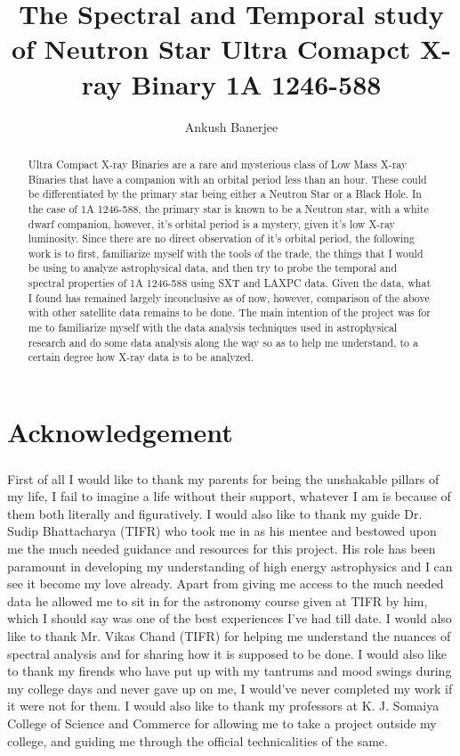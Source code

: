 \documentclass[a4paper,twoside]{report}
\title{The Spectral and Temporal study of Neutron Star Ultra Comapct X-ray Binary 1A 1246-588}
\author{Ankush Banerjee}
\numberwithin{equation}{section}
\begin{document}
\maketitle
\begin{abstract}
Ultra Compact X-ray Binaries are a rare and mysterious class of Low Mass X-ray Binaries that have a companion with an orbital period less than an hour. These could be differentiated by the primary star being either a Neutron Star or a Black Hole. In the case of 1A 1246-588, the primary star is known to be a Neutron star, with a white dwarf companion, however, it’s orbital period is a mystery, given it’s low X-ray luminosity. Since there are no direct observation of it’s orbital period, the following work is to first, familiarize myself with the tools of the trade, the things that I would be using to analyze astrophysical data, and then try to probe the temporal and spectral properties of 1A 1246-588 using SXT and LAXPC data. Given the data, what I found has remained largely inconclusive as of now, however, comparison of the above with other satellite data remains to be done. The main intention of the project was for me to familiarize myself with the data analysis techniques used in astrophysical research and do some data analysis along the way so as to help me understand, to a certain degree how X-ray data is to be analyzed.
\end{abstract}
\newpage
\tableofcontents{}
\newpage
\chapter{Acknowledgement}
\paragraph{}
First of all I would like to thank my parents for being the unshakable pillars of my life, I fail to imagine a life without their support, whatever I am is because of them both literally and figuratively. I would also like to thank my guide Dr. Sudip Bhattacharya (TIFR) who took me in as his mentee and bestowed upon me the much needed guidance and resources for this project. His role has been paramount in developing my understanding of high energy astrophysics and I can see it become my love already. Apart from giving me access to the much needed data he allowed me to sit in for the astronomy course given at TIFR by him, which I should say was one of the best experiences I've had till date. I would also like to thank Mr. Vikas Chand (TIFR) for helping me understand the nuances of spectral analysis and for sharing how it is supposed to be done. I would also like to thank my firends who have put up with my tantrums and mood swings during my college days and never gave up on me, I would've never completed my work if it were not for them. I would also like to thank my professors at K. J. Somaiya College of Science and Commerce for allowing me to take a project outside my college, and guiding me through the official technicalities of the same. 
\newpage
\end{document}
